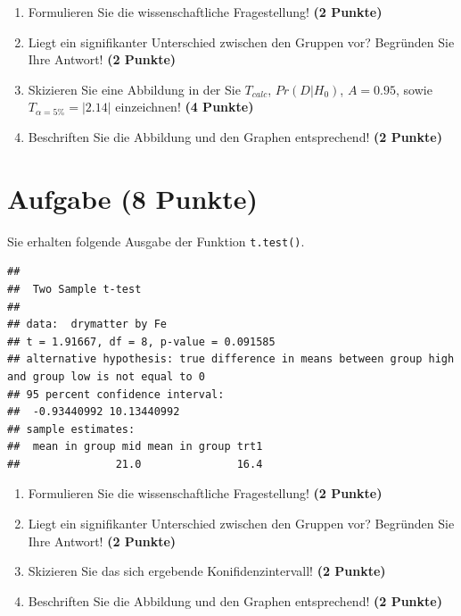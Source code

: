 \documentclass[a4paper, 10pt]{scrartcl}\usepackage[]{graphicx}\usepackage[]{color}
\makeatletter
\newenvironment{kframe}{%
 \def\at@end@of@kframe{}%
 \ifinner\ifhmode%
  \def\at@end@of@kframe{\end{minipage}}%
  \begin{minipage}{\columnwidth}%
 \fi\fi%
 \def\FrameCommand##1{\hskip\@totalleftmargin \hskip-\fboxsep
 \colorbox{shadecolor}{##1}\hskip-\fboxsep
     \hskip-\linewidth \hskip-\@totalleftmargin \hskip\columnwidth}%
 \MakeFramed {\advance\hsize-\width
   \@totalleftmargin\z@ \linewidth\hsize
   \@setminipage}}%
 {\par\unskip\endMakeFramed%
 \at@end@of@kframe}
\newenvironment{knitrout}{}{} %
\makeatother
\begin{document}
\begin{enumerate}
  \item Formulieren Sie die wissenschaftliche Fragestellung! \textbf{(2
Punkte)}
\item Liegt ein signifikanter Unterschied zwischen den Gruppen vor?
  Begr{\"u}nden Sie Ihre Antwort! \textbf{(2 Punkte)}
\item Skizieren Sie eine Abbildung in der Sie $T_{calc}$, $Pr(D|H_0)$, $A=0.95$,
  sowie $T_{\alpha=5\%} = |2.14|$ einzeichnen! \textbf{(4 Punkte)}
\item Beschriften Sie die Abbildung und
  den Graphen entsprechend! \textbf{(2 Punkte)}  
\end{enumerate} 
\clearpage

\section{Aufgabe \hfill (8 Punkte)}

Sie erhalten folgende \Rlogo Ausgabe der Funktion \texttt{t.test()}.

\begin{knitrout}
\color{fgcolor}\begin{kframe}
\begin{verbatim}
## 
## 	Two Sample t-test
## 
## data:  drymatter by Fe
## t = 1.91667, df = 8, p-value = 0.091585
## alternative hypothesis: true difference in means between group high and group low is not equal to 0
## 95 percent confidence interval:
##  -0.93440992 10.13440992
## sample estimates:
##  mean in group mid mean in group trt1 
##               21.0               16.4
\end{verbatim}
\end{kframe}
\end{knitrout}


\begin{enumerate}
  \item Formulieren Sie die wissenschaftliche Fragestellung! \textbf{(2
Punkte)}
\item Liegt ein signifikanter Unterschied zwischen den Gruppen vor?
  Begr{\"u}nden Sie Ihre Antwort! \textbf{(2 Punkte)}
\item Skizieren Sie das sich ergebende Konifidenzintervall! \textbf{(2 Punkte)}
\item Beschriften Sie die Abbildung und
  den Graphen entsprechend! \textbf{(2 Punkte)}  
\end{enumerate} 
\clearpage
\end{document}
